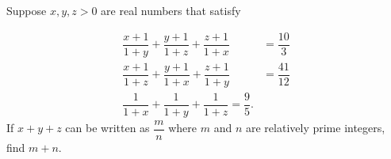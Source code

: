 Suppose $x,y,z>0$ are real numbers that satisfy

\begin{align*}
\dfrac{x+1}{1+y}+\dfrac{y+1}{1+z}+\dfrac{z+1}{1+x}&=\dfrac{10}{3}\\
\dfrac{x+1}{1+z}+\dfrac{y+1}{1+x}+\dfrac{z+1}{1+y}&=\dfrac{41}{12}\\
\dfrac{1}{1+x}+\dfrac{1}{1+y}+\dfrac{1}{1+z}=\dfrac{9}{5}.
\end{align*}If $x+y+z$ can be written as $\dfrac{m}{n}$ where $m$ and $n$ are relatively prime integers, find $m+n$.
